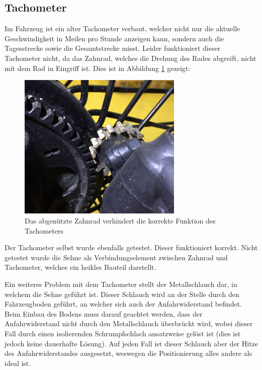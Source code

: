 \subsection{Tachometer}
Im Fahrzeug ist ein alter Tachometer verbaut, welcher nicht nur die aktuelle Geschwindigkeit in Meilen pro Stunde anzeigen kann, sondern auch die Tagesstrecke sowie die Gesamtstrecke misst. Leider funktioniert dieser Tachometer nicht, da das Zahnrad, welches die Drehung des Rades abgreift, nicht mit dem Rad in Eingriff ist. Dies ist in Abbildung \ref{fig:Zahnrad} gezeigt:

\begin{figure}[h]
	\centering
		\includegraphics[width=0.70\textwidth]{images/Zahnrad.jpg}
	\caption{Das abgenützte Zahnrad verhindert die korrekte Funktion des Tachometers}
	\label{fig:Zahnrad}
\end{figure}

Der Tachometer selbst wurde ebenfalls getestet. Dieser funktioniert korrekt. Nicht getestet wurde die Sehne als Verbindungselement zwischen Zahnrad und Tachometer, welches ein heikles Bauteil darstellt.

Ein weiteres Problem mit dem Tachometer stellt der Metallschlauch dar, in welchem die Sehne geführt ist. Dieser Schlauch wird an der Stelle durch den Fahrzeugboden geführt, an welcher sich auch der Anfahrwiderstand befindet. Beim Einbau des Bodens muss darauf geachtet werden, dass der Anfahrwiderstand nicht durch den Metallschlauch überbrückt wird, wobei dieser Fall durch einen isolierenden Schrumpfschlach ansatzweise gelöst ist (dies ist jedoch keine dauerhafte Lösung). Auf jeden Fall ist dieser Schlauch aber der Hitze des Anfahrwiderstandes ausgesetzt, weswegen die Positionierung alles andere als ideal ist.

